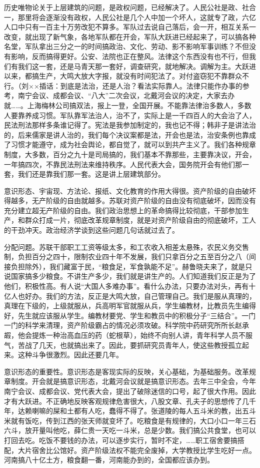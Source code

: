 历史唯物论关于上层建筑的问题，是政权问题，已经解决了。人民公社是政、社合一，那里将会逐渐没有政权，人民公社是几个人中加一个坏人，这就专了政，六亿人口中只有一百主十万劳改犯不算多。军队过去说自己落后，会一开，相互关系一改变，就出现了新气象，各地军队都在开会，军队大跃进已经起来了，可以搞各种名堂，军队拿出三分之一的时间搞政治、文化、劳动、影不影响军事训练？不但没有影响，反而搞得更好。公安、法院也正在整风。法律这个东西没有也不行，但我们有我们这一套，还是马青天那一套好，调查研究，就地解决。调解为主。大跃进以来，都搞生产，大鸣大放大字报，就没有时间犯法了。对付盗窃犯不靠群众不行。（刘××插话：到底是法治，还是人治？看法实际靠人。法律只能作办事的参考，南宁会议、成都会议、“八大”二次会议，北戴河会议的决定，大家去办就……。上海梅林公司搞双法，报上一登，全国开展。不能靠法律治多数人，多数人要靠养成习惯。军队靠军法治人，治不了，实际上是一千四百人的大会治了人，民法刑法那样多条谁记得了。宪法是我参加制定的，我也记不得；韩非子是讲法治的，后来儒家是讲人治的，我们每个决议案都是法，开会也是法，治安条例也靠成了习惯才能遵守，成为社会舆论，都自觉了，就可以到共产主义了。我们各种规章制度，大多数，百分之九十是司局搞的，我们基本不靠那些，主要靠决议，开会，一年搞四次，不靠民法刑法来维持秩序。人民代表大会，国务院开会有他们那一套，我们还是靠我们那一套。这是讲上层建筑部分。

意识形态、宇宙现、方法论、报纸、文化教育的作用大得很。资产阶级的自由破坏得越多，无产阶级的自由就越多。苏联对资产阶级的自由没有彻底破坏，因而没有充分建立超无产阶级的自由。我们政治思想上的革命搞得比较彻底，干部参加生产，和群众打成一片，彻底改革规章制度，就是对资产阶级自由的彻底破坏，工人的干劲冲天。政治经济学谈到这些问题几句话就过去了。

分配问题。苏联干部职工工资等级太多，和工农收入相差太悬殊，农民义务交售制，负担百分之四十，限制农业四十年不发展，我们只拿百分之五至百分之八（间接负担除外），我们藏富于民，“粮食足，军食孰能不足”。赫鲁晓夫来了，就是只说国家搞多少粮食。不讲生产多少，我们就是讲生产的。人们知道我们反正是为了他们，积极性高。有人说“大国人多难办事”。看什么办法，只要办法对头，再有十亿人也好办。我们的方法，反正是大鸣大放，自己管理自己。我们是服从真理的，真理在下级的，上级就服从，兵高明军官就服从兵，学生编教材，比教员先生编得好，先生就应该服从学生。编教材要党、学生和教员中的积极分子“三结合”。一门一门的科学来清理，资产阶级霸占的情况必须攻破。科学院中药研究所所长赵承嘏，他会提炼一种治高血压的药（蛇根草），始终不向别人讲，青年科学人员不服气，苦战了几天，也就搞出来了。因此，要抓研究员青年人，使这些教授孤立起来。这种斗争很激烈。因此还要几年。

意识形态的重要性。意识形态是客现实际的反映，关心基础，为基础服务。改革规章制度。开会就是搞意识形态，北戴河会议就是搞意识形态。去年三中全会，今年南宁会议、成都会议、党代表大会，提出了破除迷信的口号，起了很大作用。因此才有大跃进。不正确地反映客观规律危害很大，八股文章、孔夫子的思想传了几千年，达赖喇嘛的屎和土都有人吃，蠢得不得了。张道陵的每人五斗米的教，出五斗米就有饭吃，传到江西的张天师就变坏了。吃粮食是有规律的，大口小口一年三石六斗，放开量叫他吃，薛仁贵一天吃一斗米，总是少数。我们搞公共食堂，也可以打回去吃。吃饭不要钱的办法，可以逐步实行，暂时不定，……职工宿舍要搞搭配，大片宿舍比公馆好。资产阶级法权不能完全废掉，大学教授比学生吃好一点。河南搞八十亿土方，粮食翻一番，河南能办到的，全国都应该办到。

